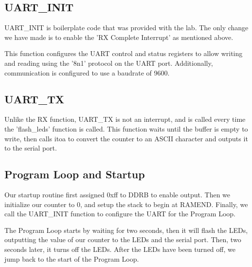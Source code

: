 \documentclass[letterpaper,11pt]{texMemo} %
\begin{document}
\subsection*{UART\_INIT}
UART\_INIT is boilerplate code that was provided with the lab. The only change we have made is to enable the 'RX Complete Interrupt' as mentioned above.

This function configures the UART control and status registers to allow writing and reading using the '8n1' protocol on the UART port. Additionally, communication is configured to use a baudrate of 9600.

\subsection*{UART\_TX}
Unlike the RX function, UART\_TX is not an interrupt, and is called every time the 'flash\_leds' function is called. This function waits until the buffer is empty to write, then calls itoa to convert the counter to an ASCII character and outputs it to the serial port.

\subsection*{Program Loop and Startup}
Our startup routine first assigned 0xff to DDRB to enable output. Then we initialize our counter to 0, and setup the stack to begin at RAMEND. Finally, we call the UART\_INIT function to configure the UART for the Program Loop.

The Program Loop starts by waiting for two seconds, then it will flash the LEDs, outputting the value of our counter to the LEDs and the serial port. Then, two seconds later, it turns off the LEDs. After the LEDs have been turned off, we jump back to the start of the Program Loop.
\end{document}
